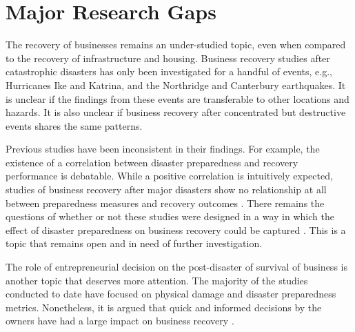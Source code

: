 \section{Major Research Gaps} 
The recovery of businesses remains an under-studied topic, even when compared to the recovery of infrastructure and housing. Business recovery studies after catastrophic disasters has only been investigated for a handful of events, e.g., Hurricanes Ike and Katrina, and the Northridge and Canterbury earthquakes. It is unclear if the findings from these events are transferable to other locations and hazards. It is also unclear if business recovery after concentrated but destructive events shares the same patterns. \ 

Previous studies have been inconsistent in their findings. For example, the existence of a correlation between disaster preparedness and recovery performance is debatable. While a positive correlation is intuitively expected, studies of business recovery after major disasters show no relationship at all between preparedness measures and recovery outcomes \citet{webb2000businesses}. There remains the questions of whether or not these studies were designed in a way in which the effect of disaster preparedness on business recovery could be captured \citep{xiao2014hazard}. This is a topic that remains open and in need of further investigation.\ 

The role of entrepreneurial decision on the post-disaster of survival of business is another topic that deserves more attention. The majority of the studies conducted to date have focused on physical damage and disaster preparedness metrics. Nonetheless, it is argued that quick and informed decisions by the owners have had a large impact on business recovery \citep{morrish2020post}.\

